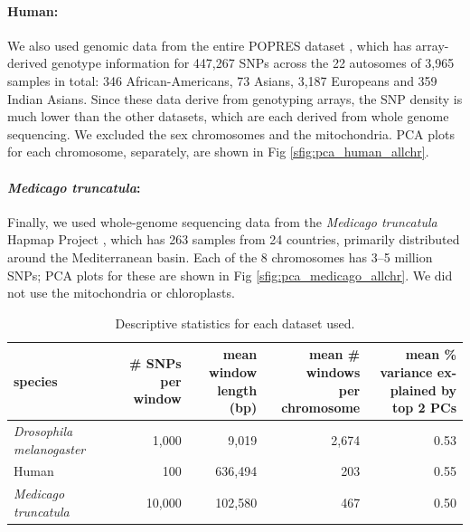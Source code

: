 \documentclass[11pt, oneside]{article}   	%
\newcommand\citep{\cite}
\newcommand{\Figure}{Fig }
\newcommand{\Figure}{{Figure }}
\begin{document}
\paragraph{Human:}
We also used genomic data from the entire POPRES dataset \citep{nelson2008population},
which has array-derived genotype information for 447,267 SNPs across the 22 autosomes
of 3,965 samples in total: 346 African-Americans, 73 Asians, 3,187 Europeans and 359 Indian Asians.
Since these data derive from genotyping arrays, the SNP density is much lower than the other datasets,
which are each derived from whole genome sequencing.
We excluded the sex chromosomes and the mitochondria.
PCA plots for each chromosome, separately, are shown in \Figure \ref{sfig:pca_human_allchr}.


\paragraph{\textit{Medicago truncatula}:}
Finally, we used whole-genome sequencing data from the \textit{Medicago truncatula} Hapmap Project \citep{tang2014improved},
which has 263 samples from 24 countries,
primarily distributed around the Mediterranean basin.
Each of the 8 chromosomes has 3--5 million SNPs;
PCA plots for these are shown in \Figure \ref{sfig:pca_medicago_allchr}.
We did not use the mitochondria or chloroplasts.

\begin{table}[ht]
\centering
    \begin{tabular}{p{0.8in}rrrr}
  \hline
    species 
    & \parbox[t]{.8in}{\# SNPs per \\ window} 
    & \parbox[t]{1in}{mean window\\ length (bp)}
    & \parbox[t]{1.2in}{mean \# windows \\ per chromosome} 
    & \parbox[t]{1.4in}{mean \% variance ex-\\plained by top 2 PCs} \\ 
  \hline
  \textit{Drosophila melanogaster} & 1,000 & 9,019 & 2,674 & 0.53 \\ 
  Human & 100 & 636,494 & 203 & 0.55 \\ 
  \textit{Medicago truncatula} & 10,000 & 102,580 & 467 & 0.50 \\ 
   \hline
\end{tabular}
\caption{
    Descriptive statistics for each dataset used.
    \label{tab:data_stats}
}
\end{table}
\end{document}
